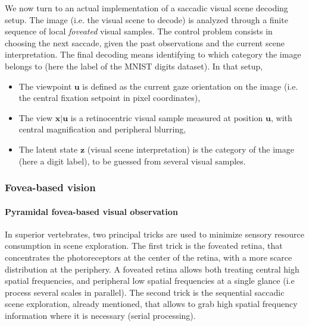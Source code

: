 \documentclass[12pt,twoside,openright]{article}
\begin{document}
{\color{Purple} We now turn to an actual implementation of a saccadic visual scene decoding setup. The   image (i.e. the visual scene to decode) is analyzed through a finite sequence of local \emph{foveated} visual samples.  The control problem consists in choosing the next saccade, given the past observations and the current scene interpretation. The final decoding means identifying to which category the image belongs to (here the label of the MNIST digits dataset). 
	In that setup, 
	\begin{itemize}
		\item The viewpoint $\boldsymbol{u}$ is defined as the current gaze orientation on the image (i.e. the central fixation setpoint in pixel coordinates),
		\item The view $\boldsymbol{x}|\boldsymbol{u}$ is a retinocentric visual sample measured at position $\boldsymbol{u}$, with central magnification and peripheral blurring,
		\item The latent state $\boldsymbol{z}$ (visual scene interpretation) is the category of the image (here a digit label), to be guessed from several visual samples.
	\end{itemize} 
}

\subsubsection{Fovea-based vision}\label{sec:fovea-based}

\paragraph{Pyramidal fovea-based visual observation} 
In superior vertebrates, two principal tricks are used to minimize sensory resource consumption in scene exploration. The first trick is the foveated retina, that concentrates the photoreceptors at the center of the retina, with a more scarce distribution at the periphery. A foveated retina allows both treating central high spatial frequencies, and peripheral low spatial frequencies at a single glance (i.e process several scales in parallel). The second trick is the sequential saccadic scene exploration, already mentioned, that allows to grab high spatial frequency information where it is necessary (serial processing).
\end{document}
